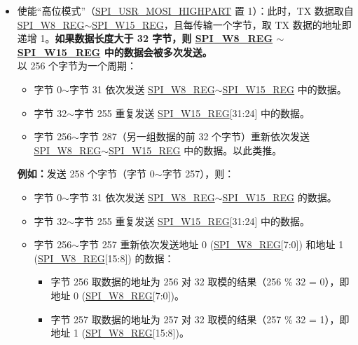 \documentclass[main\_\_CN.tex]{subfiles}
\begin{document}
\begin{itemize}
\begin{itemize}
\begin{itemize}
        \end{itemize}
        \item 使能“高位模式”（\hyperref[fielddesc:SPIUSRMOSIHIGHPART]{SPI\_USR\_MOSI\_HIGHPART} 置 1）：此时，TX 数据取自 \hyperref[regdesc:SPIW8REG]{SPI\_W8\_REG}$\sim$\hyperref[regdesc:SPIW15REG]{SPI\_W15\_REG}，且每传输一个字节，取 TX 数据的地址即递增 1。\textbf{如果数据长度大于 32 字节，则 \hyperref[regdesc:SPIW8REG]{SPI\_W8\_REG} $\sim$ \hyperref[regdesc:SPIW15REG]{SPI\_W15\_REG} 中的数据会被多次发送。}\\
        以 256 个字节为一个周期：
        \begin{itemize}
            \item 字节 0$\sim$字节 31 依次发送 \hyperref[regdesc:SPIW8REG]{SPI\_W8\_REG}$\sim$\hyperref[regdesc:SPIW15REG]{SPI\_W15\_REG} 中的数据。
            \item 字节 32$\sim$字节 255 重复发送 \hyperref[regdesc:SPIW15REG]{SPI\_W15\_REG}[31:24] 中的数据。
            \item 字节 256$\sim$字节 287（另一组数据的前 32 个字节）重新依次发送 \hyperref[regdesc:SPIW8REG]{SPI\_W8\_REG}$\sim$\hyperref[regdesc:SPIW15REG]{SPI\_W15\_REG} 中的数据。以此类推。
        \end{itemize}
        \textbf{例如：}发送 258 个字节（字节 0$\sim$字节 257），则：
        \begin{itemize}
            \item 字节 0$\sim$字节 31 依次发送 \hyperref[regdesc:SPIW8REG]{SPI\_W8\_REG}$\sim$\hyperref[regdesc:SPIW15REG]{SPI\_W15\_REG} 的数据。
            \item 字节 32$\sim$字节 255 重复发送 \hyperref[regdesc:SPIW15REG]{SPI\_W15\_REG}[31:24] 中的数据。
            \item 字节 256$\sim$字节 257 重新依次发送地址 0 (\hyperref[regdesc:SPIW8REG]{SPI\_W8\_REG}[7:0]) 和地址 1 (\hyperref[regdesc:SPIW8REG]{SPI\_W8\_REG}[15:8]) 的数据：
                \begin{itemize}
                    \item 字节 256 取数据的地址为 256 对 32 取模的结果（256 \% 32 = 0），即地址 0 (\hyperref[regdesc:SPIW8REG]{SPI\_W8\_REG}[7:0])。
                    \item 字节 257 取数据的地址为 257 对 32 取模的结果（257 \% 32 = 1），即地址 1 (\hyperref[regdesc:SPIW8REG]{SPI\_W8\_REG}[15:8])。
                \end{itemize}
        \end{itemize}        
        

\end{itemize}
\end{itemize}
\end{document}
